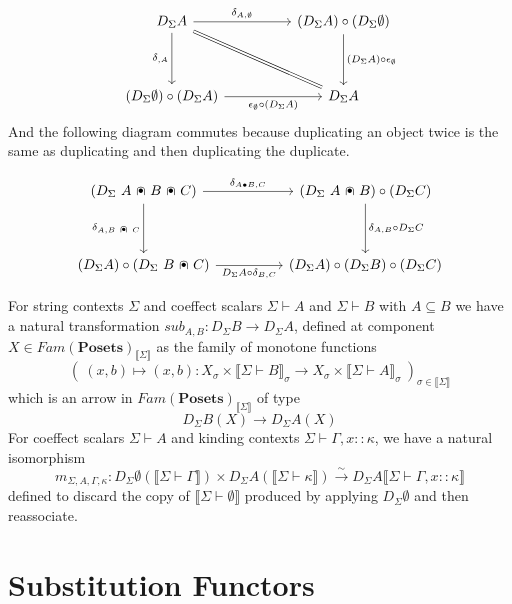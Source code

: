 \documentclass{article}
\newcommand{\mbf}{\mathbf}
\newcommand{\sem}[1]{\llbracket #1 \rrbracket}
\newcommand{\capdot}{~\stackinset{c}{}{c}{}{\scalebox{0.8}{$\bullet$}}{$\cap$}~}
\begin{document}
\[\begin{tikzcd}
	{D_{\Sigma} A} && {(D_{\Sigma} A) \circ (D_{\Sigma} \emptyset)} \\
	\\
	{(D_{\Sigma} \emptyset) \circ (D_{\Sigma} A)} && {D_{\Sigma} A}
	\arrow["{\delta_{\empty,A}}"', from=1-1, to=3-1]
	\arrow["{\epsilon_{\emptyset} \circ (D_{\Sigma} A)}"', from=3-1, to=3-3]
	\arrow["{\delta_{A, \emptyset}}", from=1-1, to=1-3]
	\arrow["{(D_{\Sigma} A) \circ \epsilon_{\emptyset}}", from=1-3, to=3-3]
	\arrow[no head, equals, from=1-1, to=3-3]
\end{tikzcd}\]
And the following diagram commutes because duplicating an object twice is the same as duplicating and then duplicating the duplicate.

\[\begin{tikzcd}
	{(D_{\Sigma}~A \capdot B \capdot C)} && {(D_{\Sigma}~A \capdot B) \circ (D_{\Sigma} C)} \\
	\\
	{(D_{\Sigma} A) \circ (D_{\Sigma}~B \capdot C)} && {(D_{\Sigma} A) \circ (D_{\Sigma} B) \circ (D_{\Sigma} C)}
	\arrow["{\delta_{A, B \capdot C}}"', from=1-1, to=3-1]
	\arrow["{D_{\Sigma} A \circ \delta_{B,C}}"', from=3-1, to=3-3]
	\arrow["{\delta_{A \bullet B, C}}", from=1-1, to=1-3]
	\arrow["{\delta_{A,B} \circ D_{\Sigma} C}", from=1-3, to=3-3]
\end{tikzcd}\]

For string contexts $\Sigma$ and coeffect scalars $\Sigma \vdash A$ and $\Sigma \vdash B$ with $A \subseteq B$ we have a natural transformation $\mathit{sub}_{A,B} : D_{\Sigma} B \to D_{\Sigma } A$, defined at component $X \in \mathit{Fam}(\mbf{Posets})_{\sem{\Sigma}}$ as the family of monotone functions $$(~(x,b) \mapsto (x,b) : X_\sigma \times \sem{\Sigma \vdash B}_\sigma \to X_{\sigma} \times \sem{\Sigma \vdash A}_{\sigma}~)_{\sigma \in \sem{\Sigma}}$$
which is an arrow in $\mathit{Fam}(\mbf{Posets})_{\sem{\Sigma}}$ of type $$D_{\Sigma}B(X) \to D_{\Sigma}A(X)$$
For coeffect scalars $\Sigma \vdash A$ and kinding contexts $\Sigma \vdash \Gamma,x :: \kappa$, we have a natural isomorphism $$m_{\Sigma,A,\Gamma,\kappa} : D_{\Sigma} \emptyset(\sem{\Sigma \vdash \Gamma}) \times D_{\Sigma} A( \sem{\Sigma \vdash \kappa} ) \overset{\sim}{\to} D_{\Sigma} A \sem{\Sigma \vdash \Gamma,x :: \kappa}$$ defined to discard the copy of $\sem{\Sigma \vdash \emptyset}$ produced by applying $D_{\Sigma} \emptyset$ and then reassociate.

\section*{Substitution Functors}
\end{document}
